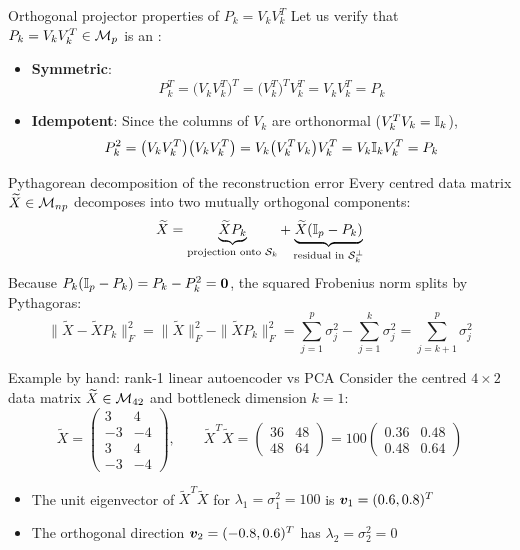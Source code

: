 \documentclass[aspectratio=169]{beamer}\usepackage[]{graphicx}\usepackage[]{xcolor}
\begin{document}
\begin{frame}{Orthogonal projector properties of $P_k = V_k V_k^T$}
Let us verify that $P_k = V_k V_k^T \in \mathcal{M}_p$ is an :
\vfill
\begin{itemize}
\item \textbf{Symmetric}:
\[
P_k^T = \big(V_k V_k^T\big)^T = \big(V_k^T\big)^T V_k^T = V_k V_k^T = P_k
\]
\vfill
\item \textbf{Idempotent}: Since the columns of $V_k$ are orthonormal ($V_k^T V_k = \mathbb{I}_k$),
\[
P_k^2 = \big(V_k V_k^T\big)\big(V_k V_k^T\big) = V_k \big(V_k^T V_k\big) V_k^T = V_k \mathbb{I}_k V_k^T = P_k
\]
\end{itemize}
\end{frame}


\begin{frame}{Pythagorean decomposition of the reconstruction error}
Every centred data matrix $\widetilde{X} \in \mathcal{M}_{np}$ decomposes into two mutually orthogonal components:
\[
\widetilde{X} = \underbrace{\widetilde{X} P_k}_{\text{projection onto } \mathcal{S}_k} + \underbrace{\widetilde{X} (\mathbb{I}_p - P_k)}_{\text{residual in } \mathcal{S}_k^\perp}
\]
\vfill
Because $P_k(\II_p - P_k) = P_k - P_k^2 = \b0$, the squared Frobenius norm splits by Pythagoras:
\[
\|\widetilde{X} - \widetilde{X} P_k\|_F^2 = \|\widetilde{X}\|_F^2 - \|\widetilde{X} P_k\|_F^2 = \sum_{j=1}^p \sigma_j^2 - \sum_{j=1}^k \sigma_j^2 = \sum_{j=k+1}^p \sigma_j^2
\]
\end{frame}


\begin{frame}{Example by hand: rank-1 linear autoencoder vs PCA}
Consider the centred $4 \times 2$ data matrix $\widetilde{X} \in \mathcal{M}_{42}$ and bottleneck dimension $k = 1$:
\[
\widetilde{X} = \begin{pmatrix} 3 & 4 \\ -3 & -4 \\ 3 & 4 \\ -3 & -4 \end{pmatrix}, \qquad
\widetilde{X}^T \widetilde{X} = \begin{pmatrix} 36 & 48 \\ 48 & 64 \end{pmatrix} = 100 \begin{pmatrix} 0.36 & 0.48 \\ 0.48 & 0.64 \end{pmatrix}
\]
\vfill
\begin{itemize}
\item The unit eigenvector of $\widetilde{X}^T \widetilde{X}$ for $\lambda_1 = \sigma_1^2 = 100$ is $\bm{v}_1 = (0.6, 0.8)^T$
\vfill
\item The orthogonal direction $\bm{v}_2 = (-0.8, 0.6)^T$ has $\lambda_2 = \sigma_2^2 = 0$
\end{itemize}
\end{frame}
\end{document}
